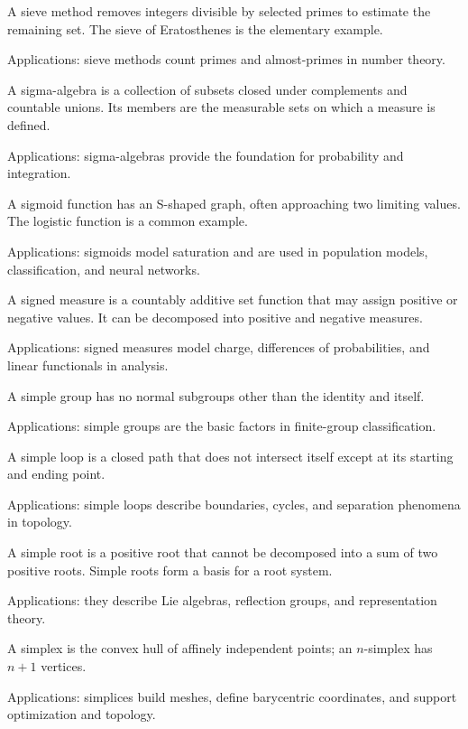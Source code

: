 A sieve method removes integers divisible by selected primes to estimate the remaining set. The sieve of Eratosthenes is the elementary example. \par\noindent Applications: sieve methods count primes and almost-primes in number theory.

A sigma-algebra is a collection of subsets closed under complements and countable unions. Its members are the measurable sets on which a measure is defined. \par\noindent Applications: sigma-algebras provide the foundation for probability and integration.

A sigmoid function has an S-shaped graph, often approaching two limiting values. The logistic function is a common example. \par\noindent Applications: sigmoids model saturation and are used in population models, classification, and neural networks.

A signed measure is a countably additive set function that may assign positive or negative values. It can be decomposed into positive and negative measures. \par\noindent Applications: signed measures model charge, differences of probabilities, and linear functionals in analysis.

A simple group has no normal subgroups other than the identity and itself. \par\noindent Applications: simple groups are the basic factors in finite-group classification.

A simple loop is a closed path that does not intersect itself except at its starting and ending point. \par\noindent Applications: simple loops describe boundaries, cycles, and separation phenomena in topology.

A simple root is a positive root that cannot be decomposed into a sum of two positive roots. Simple roots form a basis for a root system. \par\noindent Applications: they describe Lie algebras, reflection groups, and representation theory.

A simplex is the convex hull of affinely independent points; an $n$-simplex has $n+1$ vertices. \par\noindent Applications: simplices build meshes, define barycentric coordinates, and support optimization and topology.


